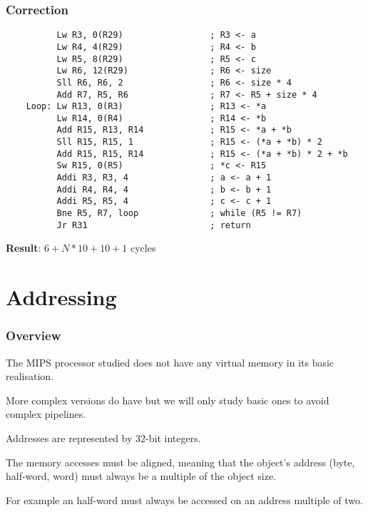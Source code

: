 \begin{frame}[containsverbatim]
  \frametitle{Correction}

  \begin{verbatim}
          Lw R3, 0(R29)                 ; R3 <- a
          Lw R4, 4(R29)                 ; R4 <- b
          Lw R5, 8(R29)                 ; R5 <- c
          Lw R6, 12(R29)                ; R6 <- size
          Sll R6, R6, 2                 ; R6 <- size * 4
          Add R7, R5, R6                ; R7 <- R5 + size * 4
    Loop: Lw R13, 0(R3)                 ; R13 <- *a
          Lw R14, 0(R4)                 ; R14 <- *b
          Add R15, R13, R14             ; R15 <- *a + *b
          Sll R15, R15, 1               ; R15 <- (*a + *b) * 2
          Add R15, R15, R14             ; R15 <- (*a + *b) * 2 + *b
          Sw R15, 0(R5)                 ; *c <- R15
          Addi R3, R3, 4                ; a <- a + 1
          Addi R4, R4, 4                ; b <- b + 1
          Addi R5, R5, 4                ; c <- c + 1
          Bne R5, R7, loop              ; while (R5 != R7)
          Jr R31                        ; return
  \end{verbatim}

  \textbf{Result}: $6 + N * 10 + 10 + 1$ cycles
\end{frame}

%
%

\section{Addressing}


\begin{frame}
  \frametitle{Overview}

  The MIPS processor studied does not have any virtual memory in its basic
  realisation.

  \nl

  More complex versions do have but we will only study basic ones to
  avoid complex pipelines.

  \nl

  Addresses are represented by 32-bit integers.

  \nl

  The memory accesses must be aligned, meaning that the object's address
  (byte, half-word, word) must always be a multiple of the object size.

  \nl

  For example an half-word must always be accessed on an address multiple
  of two.
\end{frame}

